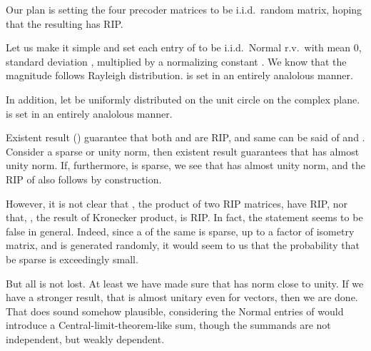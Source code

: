 \startsection [title={Restricted Isometry of Effective Beamformer}]
\startsubsection [title={Design of Beamformer Matrices}]

Our plan is setting the four precoder matrices to be i.i.d.\ random matrix, hoping that the resulting  has RIP.

Let us make it simple and set each entry of  to be i.i.d.\ Normal r.v.\ with mean 0, standard deviation , multiplied by a normalizing constant .
We know that the magnitude  follows Rayleigh distribution.
 is set in an entirely analolous manner.

In addition, let  be uniformly distributed on the unit circle on the complex plane.
 is set in an entirely analolous manner.

Existent result () guarantee that both  and  are RIP, and same can be said of  and .
Consider a sparse  or unity norm, then existent result guarantees that  has almost unity norm.
If, furthermore,  is sparse, we see that  has almost unity norm, and the RIP of  also follows by construction.

However, it is not clear that , the product of two RIP matrices, have RIP, nor that, , the result of Kronecker product, is RIP.
In fact, the statement seems to be false in general.
Indeed, since a  of the same \m {\d} is sparse, up to a factor of isometry matrix, and  is generated randomly, it would seem to us that the probability that  be sparse is exceedingly small.

But all is not lost.
At least we have made sure that  has norm close to unity.
If we have a stronger result, that  is almost unitary even for  vectors, then we are done.
That does sound somehow plausible, considering the Normal entries of  would introduce a Central-limit-theorem-like sum, though the summands are not independent, but weakly dependent.


\startsubsection [title={Confirming the Restricted Isometry}]




